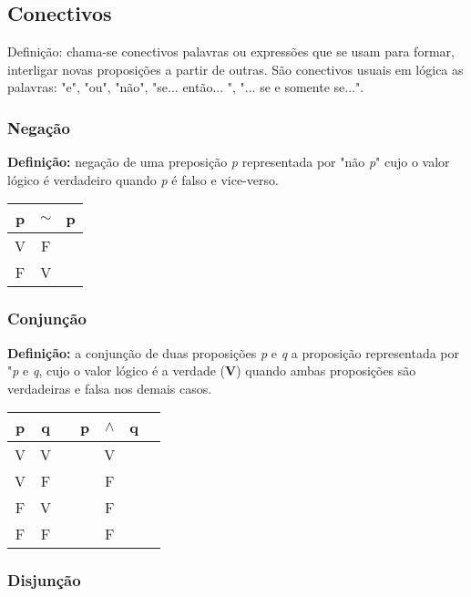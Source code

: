     \subsection{Conectivos}

Definição: chama-se conectivos palavras ou expressões que se usam para formar, interligar novas proposições a partir de outras. São conectivos usuais em lógica as palavras: "e", "ou", "não", "se... então... ", "... se e somente se...".

		\subsubsection{Negação}
		
\textbf{Definição:} negação de uma preposição \textit{p} representada por "não \textit{p}" cujo o valor lógico é verdadeiro quando \textit{p} é falso e vice-verso.

\begin{center}		
\begin{tabular}{@{ }c | c@{ }@{ }c}
	p & $\sim$ & p\\
	\hline 
	V & F & \\
	F & V & \\
\end{tabular}
\end{center}

		\subsubsection{Conjunção}

\textbf{Definição:} a conjunção de duas proposições \textit{p} e \textit{q} a proposição representada por "\textit{p} e \textit{q}, cujo o valor lógico é a verdade (\textbf{V}) quando ambas proposições são verdadeiras e falsa nos demais casos.

\begin{center}
\begin{tabular}{@{ }c@{ }@{ }c | c@{}@{ }c@{ }@{ }c@{ }@{ }c@{ }@{}c@{ }}
	p & q &  & p & $\land$ & q & \\
	\hline 
	V & V &  &  & V &  & \\
	V & F &  &  & F &  & \\
	F & V &  &  & F &  & \\
	F & F &  &  & F &  & \\
\end{tabular} 
\end{center}
	
		\subsubsection{Disjunção}

